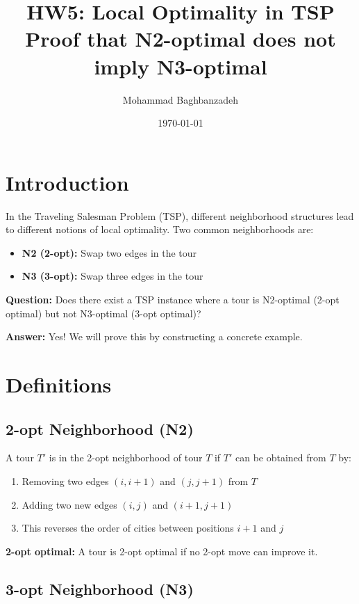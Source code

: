 \documentclass[12pt,a4paper]{article}
\title{\textbf{HW5: Local Optimality in TSP}\\
\large Proof that N2-optimal does not imply N3-optimal}
\author{Mohammad Baghbanzadeh}
\date{\today}
\begin{document}
\maketitle
\tableofcontents
\newpage

\section{Introduction}

In the Traveling Salesman Problem (TSP), different neighborhood structures lead to different notions of local optimality. Two common neighborhoods are:

\begin{itemize}
    \item \textbf{N2 (2-opt):} Swap two edges in the tour
    \item \textbf{N3 (3-opt):} Swap three edges in the tour
\end{itemize}

\textbf{Question:} Does there exist a TSP instance where a tour is N2-optimal (2-opt optimal) but not N3-optimal (3-opt optimal)?

\textbf{Answer:} Yes! We will prove this by constructing a concrete example.

\section{Definitions}

\subsection{2-opt Neighborhood (N2)}

A tour $T'$ is in the 2-opt neighborhood of tour $T$ if $T'$ can be obtained from $T$ by:
\begin{enumerate}
    \item Removing two edges $(i,i+1)$ and $(j,j+1)$ from $T$
    \item Adding two new edges $(i,j)$ and $(i+1,j+1)$
    \item This reverses the order of cities between positions $i+1$ and $j$
\end{enumerate}

\textbf{2-opt optimal:} A tour is 2-opt optimal if no 2-opt move can improve it.

\subsection{3-opt Neighborhood (N3)}
\end{document}
